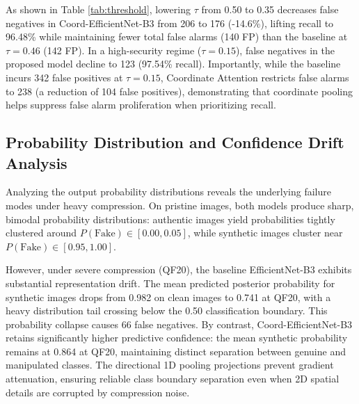 \documentclass[conference]{IEEEtran}
\begin{document}
\begin{table}[htbp]
\caption{Decision Threshold Sensitivity on Compressed Test Set}
\label{tab:threshold}
\centering
{}
\end{table}

As shown in Table \ref{tab:threshold}, lowering $\tau$ from 0.50 to 0.35 decreases false negatives in Coord-EfficientNet-B3 from 206 to 176 (-14.6\%), lifting recall to 96.48\% while maintaining fewer total false alarms (140 FP) than the baseline at $\tau = 0.46$ (142 FP). In a high-security regime ($\tau = 0.15$), false negatives in the proposed model decline to 123 (97.54\% recall). Importantly, while the baseline incurs 342 false positives at $\tau = 0.15$, Coordinate Attention restricts false alarms to 238 (a reduction of 104 false positives), demonstrating that coordinate pooling helps suppress false alarm proliferation when prioritizing recall.

\subsection{Probability Distribution and Confidence Drift Analysis}
Analyzing the output probability distributions reveals the underlying failure modes under heavy compression. On pristine images, both models produce sharp, bimodal probability distributions: authentic images yield probabilities tightly clustered around $P(\text{Fake}) \in [0.00, 0.05]$, while synthetic images cluster near $P(\text{Fake}) \in [0.95, 1.00]$.

However, under severe compression (QF20), the baseline EfficientNet-B3 exhibits substantial representation drift. The mean predicted posterior probability for synthetic images drops from 0.982 on clean images to 0.741 at QF20, with a heavy distribution tail crossing below the 0.50 classification boundary. This probability collapse causes 66 false negatives. By contrast, Coord-EfficientNet-B3 retains significantly higher predictive confidence: the mean synthetic probability remains at 0.864 at QF20, maintaining distinct separation between genuine and manipulated classes. The directional 1D pooling projections prevent gradient attenuation, ensuring reliable class boundary separation even when 2D spatial details are corrupted by compression noise.
\end{document}
